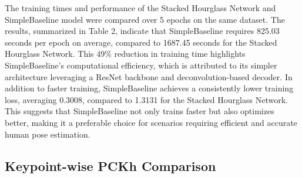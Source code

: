 \documentclass{article}
\begin{document}
The training times and performance of the Stacked Hourglass Network and SimpleBaseline model were compared over 5 epochs on the same dataset. The results, summarized in Table 2, indicate that SimpleBaseline requires 825.03 seconds per epoch on average, compared to 1687.45 seconds for the Stacked Hourglass Network. This 49\% reduction in training time highlights SimpleBaseline’s computational efficiency, which is attributed to its simpler architecture leveraging a ResNet backbone and deconvolution-based decoder.
In addition to faster training, SimpleBaseline achieves a consistently lower training loss, averaging 0.3008, compared to 1.3131 for the Stacked Hourglass Network. This suggests that SimpleBaseline not only trains faster but also optimizes better, making it a preferable choice for scenarios requiring efficient and accurate human pose estimation.

\subsection{Keypoint-wise PCKh Comparison}
\end{document}

